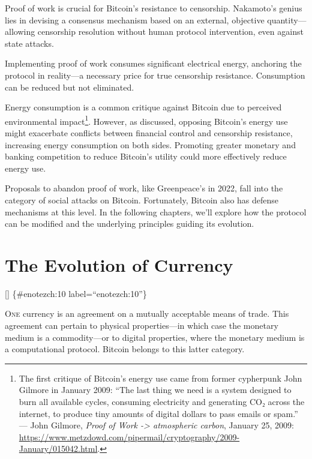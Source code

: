 \documentclass[
  a5paper,
  smalldemyvopaper,10pt,twoside,onecolumn,openright,extrafontsizes,hidelinks]{memoir}
\begin{document}

Proof of work is crucial for Bitcoin's resistance to censorship.
Nakamoto's genius lies in devising a consensus mechanism based on an
external, objective quantity---allowing censorship resolution without
human protocol intervention, even against state attacks.

Implementing proof of work consumes significant electrical energy,
anchoring the protocol in reality---a necessary price for true
censorship resistance. Consumption can be reduced but not eliminated.

Energy consumption is a common critique against Bitcoin due to perceived
environmental impact\footnote{The first critique of Bitcoin's energy use
  came from former cypherpunk John Gilmore in January 2009: ``The last
  thing we need is a system designed to burn all available cycles,
  consuming electricity and generating CO₂ across the internet, to
  produce tiny amounts of digital dollars to pass emails or spam.'' ---
  John Gilmore, \emph{Proof of Work -\textgreater{} atmospheric carbon},
  January 25, 2009:
  \url{https://www.metzdowd.com/pipermail/cryptography/2009-January/015042.html}.}.
However, as discussed, opposing Bitcoin's energy use might exacerbate
conflicts between financial control and censorship resistance,
increasing energy consumption on both sides. Promoting greater monetary
and banking competition to reduce Bitcoin's utility could more
effectively reduce energy use.

Proposals to abandon proof of work, like Greenpeace's in 2022, fall into
the category of social attacks on Bitcoin. Fortunately, Bitcoin also has
defense mechanisms at this level. In the following chapters, we'll
explore how the protocol can be modified and the underlying principles
guiding its evolution.


\chapter{The Evolution of Currency}\label{ch:change}

{[}{]} \{\#enotezch:10 label=``enotezch:10''\}

{O}\textsc{ne} currency is an agreement on a mutually acceptable means
of trade. This agreement can pertain to physical properties---in which
case the monetary medium is a commodity---or to digital properties,
where the monetary medium is a computational protocol. Bitcoin belongs
to this latter category.
\end{document}
